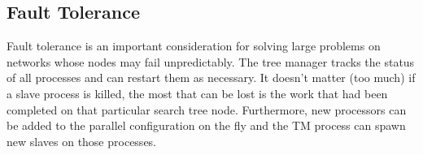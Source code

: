 \subsection{Fault Tolerance}
\label{fault-tolerance} 

Fault tolerance is an important consideration for solving large problems on
networks whose nodes may fail unpredictably. The tree manager tracks the
status of all processes and can restart them as necessary. It doesn't matter
(too much) if a slave process is killed, the most that can be lost is the work
that had been completed on that particular search tree node. Furthermore, new
processors can be added to the parallel configuration on the fly
and the TM process can spawn new slaves on those processes.
